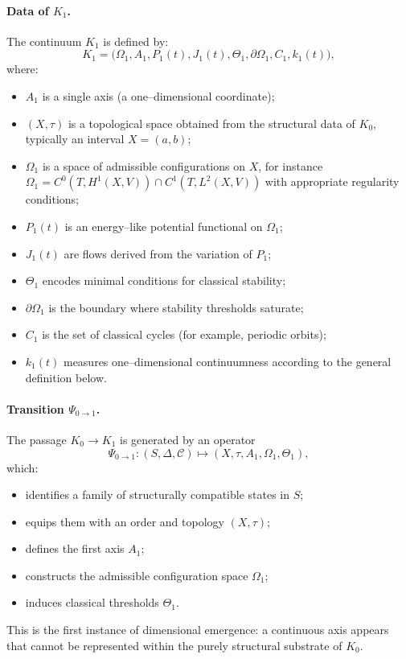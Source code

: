 \paragraph{Data of \texorpdfstring{\(K_1\)}{K1}.}
The continuum \(K_1\) is defined by:
\[
    K_1 = \big(\Omega_1,A_1,P_1(t),J_1(t),\Theta_1,\partial\Omega_1,C_1,k_1(t)\big),
\]
where:
\begin{itemize}
    \item \(A_1\) is a single axis (a one–dimensional coordinate);
    \item \((X,\tau)\) is a topological space obtained from the structural data of \(K_0\), typically an interval \(X = (a,b)\);
    \item \(\Omega_1\) is a space of admissible configurations on \(X\), for instance
          \(\Omega_1 = C^0(T,H^1(X,V)) \cap C^1(T,L^2(X,V))\) with appropriate regularity conditions;
    \item \(P_1(t)\) is an energy–like potential functional on \(\Omega_1\);
    \item \(J_1(t)\) are flows derived from the variation of \(P_1\);
    \item \(\Theta_1\) encodes minimal conditions for classical stability;
    \item \(\partial\Omega_1\) is the boundary where stability thresholds saturate;
    \item \(C_1\) is the set of classical cycles (for example, periodic orbits);
    \item \(k_1(t)\) measures one–dimensional continuumness according to the general definition below.
\end{itemize}

\paragraph{Transition \texorpdfstring{$\Psi_{0\to 1}$}{Psi 0→1}.}
The passage \(K_0 \to K_1\) is generated by an operator
\[
    \Psi_{0\to 1} : (S,\Delta,\mathcal{C}) \mapsto (X,\tau,A_1,\Omega_1,\Theta_1),
\]
which:
\begin{itemize}
    \item identifies a family of structurally compatible states in \(S\);
    \item equips them with an order and topology \((X,\tau)\);
    \item defines the first axis \(A_1\);
    \item constructs the admissible configuration space \(\Omega_1\);
    \item induces classical thresholds \(\Theta_1\).
\end{itemize}
This is the first instance of dimensional emergence: a continuous axis appears that cannot be represented within the purely structural substrate of \(K_0\).

